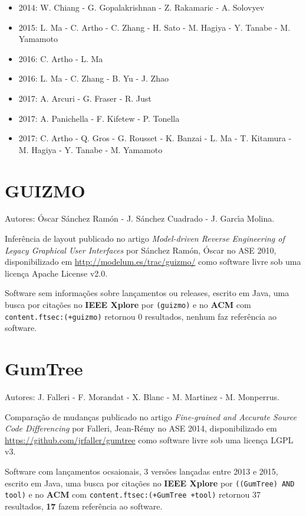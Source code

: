 \begin{itemize}
\item 2014: W. Chiang - G. Gopalakrishnan - Z. Rakamaric - A. Solovyev
\item 2015: L. Ma - C. Artho - C. Zhang - H. Sato - M. Hagiya - Y. Tanabe - M. Yamamoto
\item 2016: C. Artho - L. Ma
\item 2016: L. Ma - C. Zhang - B. Yu - J. Zhao
\item 2017: A. Arcuri - G. Fraser - R. Just
\item 2017: A. Panichella - F. Kifetew - P. Tonella
\item 2017: C. Artho - Q. Gros - G. Rousset - K. Banzai - L. Ma - T. Kitamura - M. Hagiya - Y. Tanabe - M. Yamamoto
\end{itemize}

\section{GUIZMO}

Autores:
\'{O}scar S\'{a}nchez Ram\'{o}n - J. S\'{a}nchez Cuadrado - J. Garc\'{\i}a Molina.

Inferência de layout
publicado no artigo {\it Model-driven Reverse Engineering of Legacy Graphical User Interfaces}
por S\'{a}nchez Ram\'{o}n, \'{O}scar
no ASE 2010,
disponibilizado em \url{http://modelum.es/trac/guizmo/}
como software livre
sob uma licença Apache License v2.0.

Software sem informações sobre lançamentos ou releases,
escrito em Java,
uma busca por citações no {\bf IEEE Xplore} por
\texttt{(guizmo)}
e no {\bf ACM} com
\texttt{content.ftsec:(+guizmo)}
retornou
0 resultados,
nenhum faz referência ao software.


\section{GumTree}

Autores:
J. Falleri - F. Morandat - X. Blanc - M. Martinez - M. Monperrus.

Comparação de mudanças
publicado no artigo {\it Fine-grained and Accurate Source Code Differencing}
por Falleri, Jean-R{\'e}my
no ASE 2014,
disponibilizado em \url{https://github.com/jrfaller/gumtree}
como software livre
sob uma licença LGPL v3.

Software com lançamentos ocsaionais,
3 versões lançadas
entre 2013 e 2015,
escrito em Java,
uma busca por citações no {\bf IEEE Xplore} por
\texttt{((GumTree) AND tool)}
e no {\bf ACM} com
\texttt{content.ftsec:(+GumTree +tool)}
retornou
37 resultados,
{\bf 17} fazem referência ao software.

